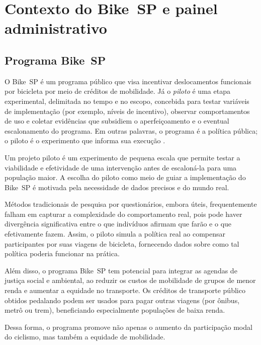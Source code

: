 
\chapter{Contexto do Bike~SP e painel administrativo}
\label{cap:contexto-painel}

\section{Programa Bike~SP}
O Bike~SP é um programa público que visa incentivar deslocamentos funcionais por
bicicleta por meio de créditos de mobilidade. Já o \textit{piloto} é uma etapa
experimental, delimitada no tempo e no escopo, concebida para testar variáveis
de implementação (por exemplo, níveis de incentivo), observar comportamentos de
uso e coletar evidências que subsidiem o aperfeiçoamento e o eventual
escalonamento do programa. Em outras palavras, o programa é a política pública;
o piloto é o experimento que informa sua execução
\citep{faria2023:bikespCaseStudy, interscity:pilotoBikeSP}.

Um projeto piloto é um experimento de pequena escala que permite testar a
viabilidade e efetividade de uma intervenção antes de escaloná-la para uma
população maior\citep{pearson2020}. A escolha do piloto como meio de guiar a
implementação do Bike~SP é motivada pela necessidade de dados precisos e do
mundo real.

Métodos tradicionais de pesquisa por questionários, embora úteis, frequentemente
falham em capturar a complexidade do comportamento real, pois pode haver
divergência significativa entre o que indivíduos afirmam que farão e o que
efetivamente fazem\citep{rundle2009}. Assim, o piloto simula a política real ao
compensar participantes por suas viagens de bicicleta, fornecendo dados sobre
como tal política poderia funcionar na prática.

Além disso, o programa Bike~SP tem potencial para integrar as agendas de justiça
social e ambiental, ao reduzir os custos de mobilidade de grupos de menor renda
e aumentar a equidade no transporte. Os créditos de transporte público obtidos
pedalando podem ser usados para pagar outras viagens (por ônibus, metrô ou trem),
beneficiando especialmente populações de baixa renda.

Dessa forma, o programa promove não apenas o aumento da participação modal do
ciclismo, mas também a equidade de mobilidade\citep{vanoutrive2020, jeekel2017}.

